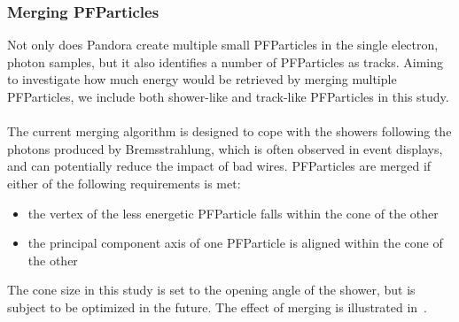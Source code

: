 \subsubsection{Merging PFParticles}
\label{sec:merging}

Not only does Pandora create multiple small PFParticles in
the single electron, photon samples,
but it also identifies a number of PFParticles as tracks.
Aiming to investigate how much energy would be retrieved by merging
multiple PFParticles, we include both shower-like and track-like
PFParticles in this study.\\
\\
The current merging algorithm is designed to cope with the showers
following the photons produced by Bremsstrahlung,
which is often observed in event displays,
and can potentially reduce the impact of bad wires.
PFParticles are merged if either of the following requirements is met:
\begin{itemize}
\item the vertex of the less energetic PFParticle falls within the 
      cone of the other
\item the principal component axis of one PFParticle is aligned
      within the cone of the other
\end{itemize}
The cone size in this study is set to the opening angle of the shower,
but is subject to be optimized in the future.
The effect of merging is illustrated in~.\\
\\
